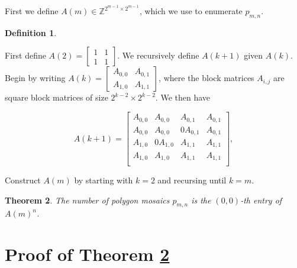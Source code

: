 \documentclass[12pt]{article}
\theoremstyle{plain}
\newtheorem{thm}{Theorem}
\theoremstyle{definition}
\newtheorem{defn}[thm]{Definition}
\theoremstyle{remark}
\theoremstyle{definition}
\begin{document}
First we define $A(m) \in \mathbb{Z}^{2^{m-1} \times 2^{m-1}}$, which we use to enumerate $p_{m,n}$.

\begin{defn}
\label{defn: A}

First define $A(2) = \begin{bmatrix}
1 & 1 \\
1 & 1
\end{bmatrix}
$. We recursively define $A(k+1)$ given $A(k)$. Begin by writing
$
A(k) = \begin{bmatrix}
A_{0,0} & A_{0,1} \\
A_{1,0} & A_{1,1}
\end{bmatrix}
$, where the block matrices $A_{i,j}$ are square block matrices of size $2^{k-2} \times 2^{k-2}$. We then have

$$
A(k+1) = \begin{bmatrix}
A_{0,0} & A_{0,0} & A_{0,1} & A_{0,1} \\
A_{0,0} & A_{0,0} & 0A_{0,1} & A_{0,1} \\
A_{1,0} & 0A_{1,0} & A_{1,1} & A_{1,1} \\
A_{1,0} & A_{1,0} & A_{1,1} & A_{1,1} \\
\end{bmatrix},
$$

Construct $A(m)$ by starting with $k=2$ and recursing until $k=m$. 

\end{defn}

\begin{thm}
\label{thm: main theorem}    
The number of polygon mosaics $p_{m,n}$ is the $(0,0)$-th entry of $A(m)^n$.
\end{thm}

\section{Proof of Theorem \ref{thm: main theorem}}
\end{document}
